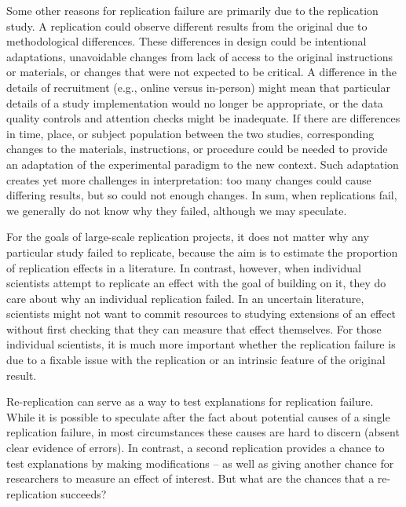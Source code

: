 \documentclass[
  english,
  a4paper,
]{article}
\begin{document}
Some other reasons for replication failure are primarily due to the replication study.
A replication could observe different results from the original due to methodological differences.
These differences in design could be intentional adaptations, unavoidable changes from lack of access to the original instructions or materials, or changes that were not expected to be critical.
A difference in the details of recruitment (e.g., online versus in-person) might mean that particular details of a study implementation would no longer be appropriate, or the data quality controls and attention checks might be inadequate.
If there are differences in time, place, or subject population between the two studies, corresponding changes to the materials, instructions, or procedure could be needed to provide an adaptation of the experimental paradigm to the new context.
Such adaptation creates yet more challenges in interpretation: too many changes could cause differing results, but so could not enough changes.
In sum, when replications fail, we generally do not know why they failed, although we may speculate.

For the goals of large-scale replication projects, it does not matter why any particular study failed to replicate, because the aim is to estimate the proportion of replication effects in a literature. In contrast, however, when individual scientists attempt to replicate an effect with the goal of building on it, they do care about why an individual replication failed. In an uncertain literature, scientists might not want to commit resources to studying extensions of an effect without first checking that they can measure that effect themselves. For those individual scientists, it is much more important whether the replication failure is due to a fixable issue with the replication or an intrinsic feature of the original result.

Re-replication can serve as a way to test explanations for replication failure. While it is possible to speculate after the fact about potential causes of a single replication failure, in most circumstances these causes are hard to discern (absent clear evidence of errors). In contrast, a second replication provides a chance to test explanations by making modifications -- as well as giving another chance for researchers to measure an effect of interest. But what are the chances that a re-replication succeeds?
\end{document}
